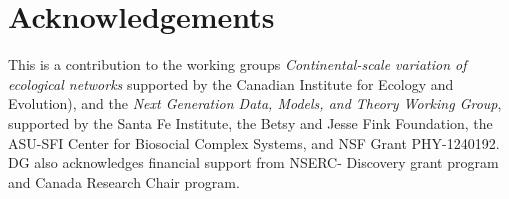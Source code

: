 \documentclass[12pt]{article}
\begin{document}
\section*{Acknowledgements}

This is a contribution to the working groups \emph {Continental-scale
variation of ecological networks} supported by the Canadian Institute for
Ecology and Evolution), and the \emph{Next Generation Data, Models, and
Theory Working Group}, supported by the Santa Fe Institute, the Betsy and
Jesse Fink Foundation, the ASU-SFI Center for Biosocial Complex Systems, and
NSF Grant PHY-1240192. DG also acknowledges financial support from NSERC-
Discovery grant program and Canada Research Chair program.

\newpage



\newpage
\end{document}
